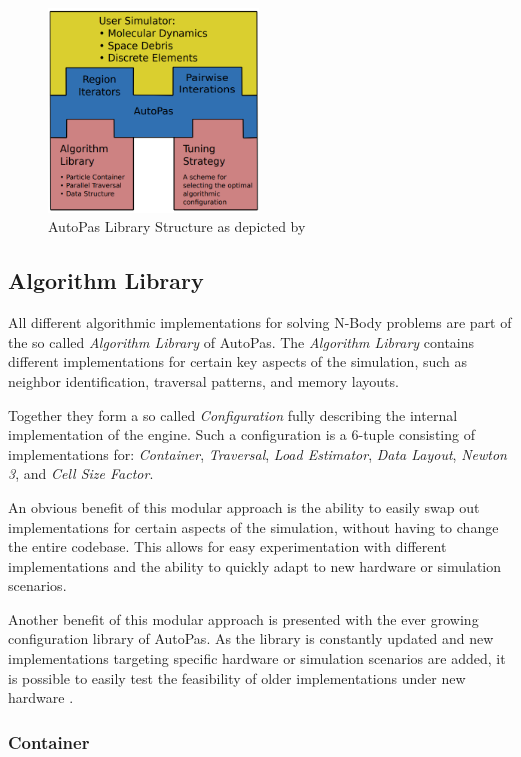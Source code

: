 \documentclass[conference]{IEEEtran}
\begin{document}
\begin{figure}[h]
    \centering
    \includegraphics[width=2.2in]{figures/AutoPasLibraryStructure.png}
    \caption{AutoPas Library Structure as depicted by \cite{Newcome2023Poster}}
    \label{fig_architecture}
\end{figure}

\subsection{Algorithm Library}

All different algorithmic implementations for solving N-Body problems are part of the so called \textit{Algorithm Library} of AutoPas. The \textit{Algorithm Library} contains different implementations for certain key aspects of the simulation, such as neighbor identification, traversal patterns, and memory layouts.

Together they form a so called \textit{Configuration} fully describing the internal implementation of the engine. Such a configuration is a 6-tuple consisting of implementations for: \textit{Container}, \textit{Traversal}, \textit{Load Estimator}, \textit{Data Layout}, \textit{Newton 3}, and \textit{Cell Size Factor}.

An obvious benefit of this modular approach is the ability to easily swap out implementations for certain aspects of the simulation, without having to change the entire codebase. This allows for easy experimentation with different implementations and the ability to quickly adapt to new hardware or simulation scenarios.

Another benefit of this modular approach is presented with the ever growing configuration library of AutoPas. As the library is constantly updated and new implementations targeting specific hardware or simulation scenarios are added, it is possible to easily test the feasibility of older implementations
under new hardware \cite{Tchipev2020}.


\subsubsection{Container}
\end{document}
